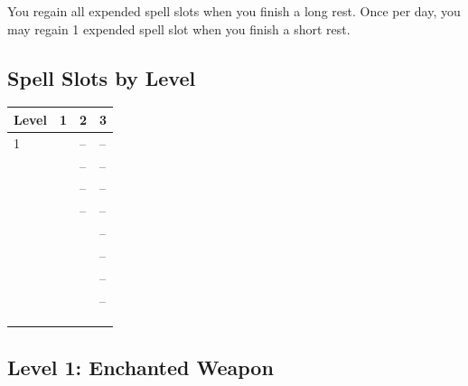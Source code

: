 \documentclass[12pt,letterpaper,twocolumn,openany,nodeprecatedcode,bg=none]{dndbook}
\let\oldsubsection\subsection
\renewcommand{\subsection}[1]{%
  \needspace{5\baselineskip}%
  \oldsubsection{#1}%
}
\begin{document}
You regain all expended spell slots when you finish a long rest. Once
per day, you may regain 1 expended spell slot when you finish a short
rest.

\subsection{Spell Slots by Level}\label{spell-slots-by-level}


{\def\LTcaptype{none} %
\begin{table}[!htbp]
\centering
\begin{tabular}{@{}
  >{\raggedright\arraybackslash}p{}
  >{\raggedright\arraybackslash}p{}
  >{\raggedright\arraybackslash}p{}
  >{\raggedright\arraybackslash}p{}@{}}
\toprule\noalign{}
\begin{minipage}[b]{\linewidth}\raggedright
Level
\end{minipage} & \begin{minipage}[b]{\linewidth}\raggedright
1
\end{minipage} & \begin{minipage}[b]{\linewidth}\raggedright
2
\end{minipage} & \begin{minipage}[b]{\linewidth}\raggedright
3
\end{minipage} \\
\midrule\noalign{}
1 & 2 & -- & -- \\
2 & 2 & -- & -- \\
3 & 3 & -- & -- \\
4 & 3 & -- & -- \\
5 & 4 & 2 & -- \\
6 & 4 & 2 & -- \\
7 & 4 & 3 & -- \\
8 & 4 & 3 & -- \\
9 & 4 & 3 & 2 \\
10 & 4 & 3 & 2 \\
\bottomrule\noalign{}
\end{tabular}
\end{table}
}

\subsection{Level 1: Enchanted Weapon}\label{level-1-enchanted-weapon}
\end{document}
